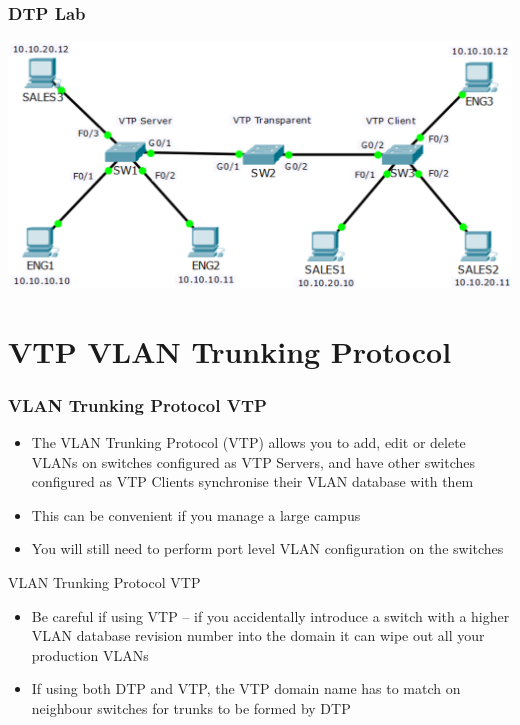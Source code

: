 \documentclass[pdflatex,compress,mathserif]{beamer}
\begin{document}
\begin{frame}
	\frametitle{DTP Lab}
	\begin{center}
		\includegraphics[width=\linewidth]{img/img41}
	\end{center}
\end{frame}

\section{VTP VLAN Trunking Protocol}

\begin{frame}
	\frametitle{VLAN Trunking Protocol VTP}
	\begin{itemize}
		\item The VLAN Trunking Protocol (VTP) allows you to add, edit or delete
VLANs on switches configured as VTP Servers, and have other switches
configured as VTP Clients synchronise their VLAN database with them
		\item This can be convenient if you manage a large campus
		\item You will still need to perform port level VLAN configuration on the
switches
	\end{itemize}
\end{frame}

\begin{frame}{VLAN Trunking Protocol VTP}
	\begin{itemize}
		\item Be careful if using VTP – if you accidentally introduce a switch with a
higher VLAN database revision number into the domain it can wipe out
all your production VLANs
		\item If using both DTP and VTP, the VTP domain name has to match on
neighbour switches for trunks to be formed by DTP
	\end{itemize}
\end{frame}
\end{document}
